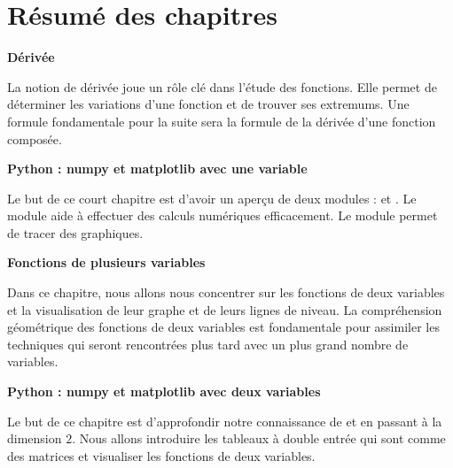 

\cleardoublepage
\thispagestyle{empty}
\tableofcontents

\cleardoublepage
\section*{Résumé des chapitres}


\newcommand{\titrechapitre}[1]{{\textbf{#1}}\nopagebreak}
\newcommand{\descriptionchapitre}[1]{%
\smallskip\hfill
\begin{minipage}{0.95\textwidth}\small#1\end{minipage}\medskip\smallskip}

\titrechapitre{Dérivée}

\descriptionchapitre{La notion de dérivée joue un rôle clé dans l'étude des fonctions. Elle permet de déterminer les variations d'une fonction et de trouver ses extremums. Une formule fondamentale pour la suite sera la formule de la dérivée d'une fonction composée.}

\titrechapitre{Python : numpy et matplotlib avec une variable}

\descriptionchapitre{Le but de ce court chapitre est d'avoir un aperçu de deux modules \Python{} : \numpy{} et \matplotlib{}. Le module \numpy{} aide à effectuer des calculs numériques efficacement. Le module \matplotlib{} permet de tracer des graphiques.}

\titrechapitre{Fonctions de plusieurs variables}

\descriptionchapitre{Dans ce chapitre, nous allons nous concentrer sur les fonctions de deux variables et la visualisation de leur graphe et de leurs lignes de niveau. 
La compréhension géométrique des fonctions de deux variables est fondamentale pour assimiler les techniques qui seront rencontrées plus tard avec un plus grand nombre de variables.}

\titrechapitre{Python : numpy et matplotlib avec deux variables}

\descriptionchapitre{Le but de ce chapitre est d'approfondir notre connaissance de \numpy{} et \matplotlib{} en passant à la dimension $2$. Nous allons introduire les tableaux à double entrée qui sont comme des matrices et visualiser les fonctions de deux variables.}

